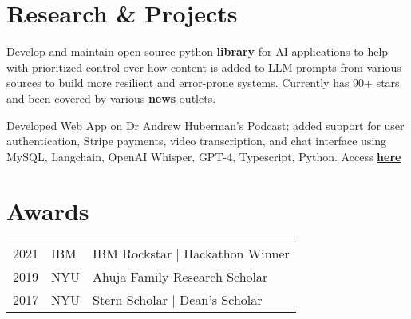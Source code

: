 \documentclass[]{deedy-resume-openfont}
\begin{document}
\begin{minipage}[t]{0.66\textwidth}
\section{Research \& Projects}

Develop and maintain open-source python \href{https://github.com/tg1482/priomptipy}{\bf library} for AI applications to help with prioritized control over how content is added to LLM prompts from various sources to build more resilient and error-prone systems. Currently has 90+ stars and been covered by various \href{https://www.marktechpost.com/2024/01/26/meet-priomptipy-a-python-library-to-budget-tokens-and-dynamically-render-prompts-for-llms/}{\bf news} outlets. 
\sectionsep

Developed Web App on Dr Andrew Huberman's Podcast; added support for user authentication, Stripe payments, video transcription, and chat interface using MySQL, Langchain, OpenAI Whisper, GPT-4, Typescript, Python. Access \href{https://www.huberman.fyi}{\bf here}
\sectionsep




\section{Awards} 
\begin{tabular}{rll}
2021	 & IBM & IBM Rockstar | Hackathon Winner \\
2019	 & NYU & Ahuja Family Research Scholar \\
2017     & NYU & Stern Scholar | Dean's Scholar \\
\end{tabular}
\sectionsep


% 
% 

\end{minipage} 
\end{document}

